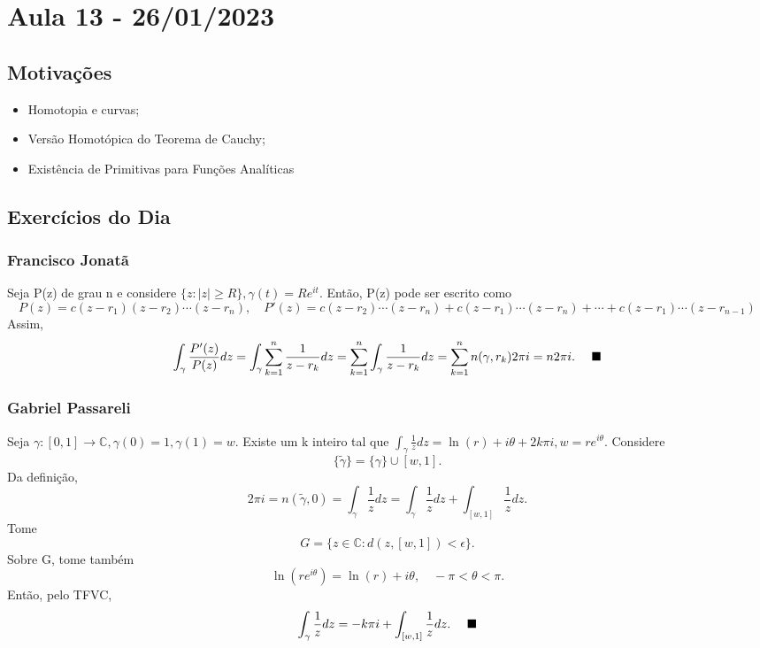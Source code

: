 \documentclass[complex.tex]{subfiles}
\begin{document}
\section{Aula 13 - 26/01/2023}
\subsection{Motivações}
\begin{itemize}
	\item Homotopia e curvas;
	\item Versão Homotópica do Teorema de Cauchy;
	\item Existência de Primitivas para Funções Analíticas
\end{itemize}

\subsection{Exercícios do Dia}
\subsubsection{Francisco Jonatã}
Seja P(z) de grau n e considere $\{z:|z|\geq R\}, \gamma(t) = Re^{it}.$ Então, P(z) pode ser escrito como
$$
	P(z) = c(z-r_{1})(z-r_2)\cdots(z-r_{n}),\quad P'(z) = c(z-r_2)\cdots(z-r_{n}) + c(z-r_{1})\cdots(z-r_{n}) + \cdots + c(z-r_1)\cdots(z-r_{n-1})
$$
Assim,
$$
	\int_{\gamma}^{}\frac{P'(z)}{P(z)}dz = \int_{\gamma}^{}\sum\limits_{k=1}^{n}\frac{1}{z-r_{k}}dz = \sum\limits_{k=1}^{n}\int_{\gamma}^{}\frac{1}{z-r_{k}}dz = \sum\limits_{k=1}^{n}n(\gamma, r_{k})2\pi i = n2\pi i.\quad\text{ $\blacksquare$}
$$

\subsubsection{Gabriel Passareli}
Seja $\gamma:[0, 1]\rightarrow \mathbb{C}, \gamma(0) = 1, \gamma(1) = w.$ Existe um k inteiro tal que $\int_{\gamma}^{}\frac{1}{z}dz = \ln{(r)} + i\theta + 2k\pi i, w=re^{i\theta}.$
Considere
$$
	\{\tilde\gamma\} = \{\gamma\}\cup{[w, 1]}.
$$
Da definição,
$$
	2\pi i = n(\tilde \gamma, 0) = \int_{\gamma}^{}\frac{1}{z}dz = \int_{\gamma}^{}\frac{1}{z}dz + \int_{[w, 1]}^{}\frac{1}{z}dz.
$$
Tome
$$
	G = \{z\in \mathbb{C}: d(z, [w, 1]) < \epsilon\}.
$$
Sobre G, tome também
$$
	\ln{(re^{i \theta})} = \ln{(r)} + i \theta, \quad -\pi < \theta < \pi.
$$
Então, pelo TFVC,
$$
	\int_{\gamma}^{}\frac{1}{z}dz = -k\pi i + \int_{[w, 1]}^{}\frac{1}{z}dz. \quad\text{ $\blacksquare$}
$$
\end{document}
